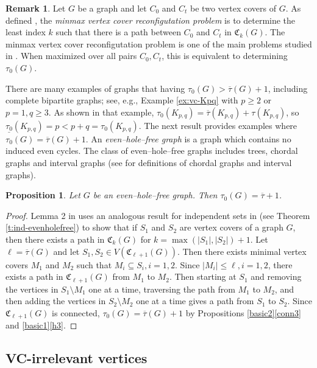 \documentclass{article}
\numberwithin{figure}{section}
\numberwithin{table}{section}
\numberwithin{equation}{section}
\newtheorem{prop}[thm]{Proposition}
\theoremstyle{definition}
\newtheorem{rem}[thm]{Remark}
\theoremstyle{definition}
\theoremstyle{definition}
\newcommand{\bpf}{\begin{proof}}
\newcommand{\epf}{\end{proof}\ms}
\newcommand{\ms}{\medskip}
\newcommand{\ol}{\overline}
\newcommand{\vc}{\tau}
\newcommand{\vcbar}{\ol\vc}
\newcommand{\vctar}{\mathfrak{C}}%
\newcommand{\vco}{\tau_0}
\newcommand{\ulvco}{\underline{\tau_0}}
\begin{document}
{\begin{rem}
Let $G$ be a graph and let $C_0$ and $C_t$ be two vertex covers of $G$.  As defined \cite{INZ15}, the \emph{minmax vertex cover reconfigutation problem} is to determine the least index $k$ such that there is a path between $C_0$ and $C_t$ in $\vctar_k(G)$. The minmax vertex cover reconfigutation problem is one of the main problems studied in \cite{INZ15}.  When  maximized over all pairs $C_0, C_t$, %
this is equivalent to determining $\vco(G)$.
\end{rem}


   There are many examples of graphs that having $\vco(G)>\vcbar(G)+1$, including complete bipartite graphs; see, e.g.,  Example \ref{ex:vc-Kpq} with $p\ge 2$ or $p=1,q\ge 3$.  As shown in that example,  $ \vco(K_{p,q})=\vcbar(K_{p,q})+\vc(K_{p,q})$, so $\ulvco(K_{p,q})=p<p+q=\vco(K_{p,q})$. 
The next result provides examples where $\vco(G)=\vcbar(G)+1$.
An {\em even--hole--free graph} is a graph which contains no induced even cycles. The class of even--hole--free graphs includes trees, chordal graphs and interval graphs  (see \cite[Section 5.5]{Diestel17} for definitions of chordal graphs and interval graphs). %

\begin{prop} \label{vctau0ehfg}
Let $G$ be an even--hole--free graph. Then $\tau_0(G)=\overline{\tau}+1$.
\end{prop}

\bpf
     Lemma 2 in \cite{INZ15} uses an analogous result for independent sets in \cite{KMM12} (see Theorem  \ref{t:ind-evenholefree}) to show that if $S_1$ and $S_2$ are vertex covers of a graph $G$, then there exists a path  in $\vctar_k(G)$ for $k= \max(|S_1|,|S_2|)+1$.
  Let $\ell=\vcbar(G)$ and let $S_1,S_2 \in V(\vctar_{\ell+1}(G))$. Then there exists minimal vertex covers $M_1$ and $M_2$ such that $M_i \subseteq S_i, i=1,2$. Since $|M_i| \leq \ell,i=1,2$, there exists a path in $\vctar_{\ell+1}(G)$ from $M_1$ to $M_2$. Then starting at $S_1$ and removing the vertices in $S_1\setminus M_1$ one at a time, traversing the path from $M_1$ to $M_2$, and then adding the vertices in $S_2\setminus M_2$ one at a time gives a path from $S_1$ to $S_2$. Since $\vctar_{\ell+1}(G)$ is connected, $\vco(G)=\vcbar(G)+1$ by Propositions \ref{basic2}\eqref{conn3} and \ref{basic1}\eqref{h3}.
    \epf
\subsection{VC-irrelevant vertices}\label{s:vc-irrel}

}
\end{document}
